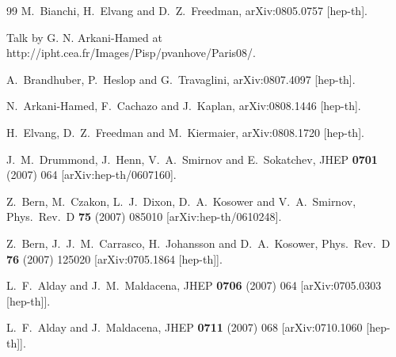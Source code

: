 \documentclass[12pt]{article}
\begin{document}
{\begin{thebibliography}{99}
  M.~Bianchi, H.~Elvang and D.~Z.~Freedman,
  arXiv:0805.0757 [hep-th].

 Talk by G. N. Arkani-Hamed at http://ipht.cea.fr/Images/Pisp/pvanhove/Paris08/.

  A.~Brandhuber, P.~Heslop and G.~Travaglini,
  arXiv:0807.4097 [hep-th].

  N.~Arkani-Hamed, F.~Cachazo and J.~Kaplan,
  arXiv:0808.1446 [hep-th].

  H.~Elvang, D.~Z.~Freedman and M.~Kiermaier,
  arXiv:0808.1720 [hep-th].

  J.~M.~Drummond, J.~Henn, V.~A.~Smirnov and E.~Sokatchev,
  JHEP {\bf 0701} (2007) 064
  [arXiv:hep-th/0607160].

  Z.~Bern, M.~Czakon, L.~J.~Dixon, D.~A.~Kosower and V.~A.~Smirnov,
  Phys.\ Rev.\  D {\bf 75} (2007) 085010
  [arXiv:hep-th/0610248].

  Z.~Bern, J.~J.~M.~Carrasco, H.~Johansson and D.~A.~Kosower,
  Phys.\ Rev.\  D {\bf 76} (2007) 125020
  [arXiv:0705.1864 [hep-th]].

  L.~F.~Alday and J.~M.~Maldacena,
  JHEP {\bf 0706} (2007) 064
  [arXiv:0705.0303 [hep-th]].

  L.~F.~Alday and J.~Maldacena,
  JHEP {\bf 0711} (2007) 068
  [arXiv:0710.1060 [hep-th]].



\end{thebibliography}}
\end{document}
